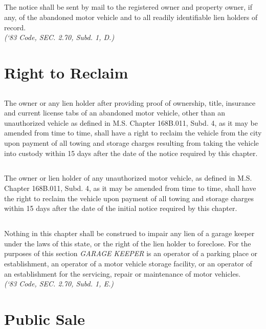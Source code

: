 \documentclass[code.tex]{subfiles}
\begin{document}
\subsection{}
The notice shall be sent by mail to the registered owner and property owner, if any, of the abandoned motor vehicle and to all readily identifiable lien holders of record.\\
\emph{(‘83 Code, SEC. 2.70, Subd. 1, D.)}

\section{Right to Reclaim}
\subsection{}
The owner or any lien holder after providing proof of ownership, title, insurance and current license tabs of an abandoned motor vehicle, other than an unauthorized vehicle as defined in M.S. Chapter 168B.011, Subd. 4, as it may be amended from time to time, shall have a right to reclaim the vehicle from the city upon payment of all towing and storage charges resulting from taking the vehicle into custody within 15 days after the date of the notice required by this chapter.
\subsection{}
The owner or lien holder of any unauthorized motor vehicle, as defined in M.S. Chapter 168B.011, Subd. 4, as it may be amended from time to time, shall have the right to reclaim the vehicle upon payment of all towing and storage charges within 15 days after the date of the initial notice required by this chapter.
\subsection{}
Nothing in this chapter shall be construed to impair any lien of a garage keeper under the laws of this state, or the right of the lien holder to foreclose.  For the purposes of this section \emph{GARAGE KEEPER} is an operator of a parking place or establishment, an operator of a motor vehicle storage facility, or an operator of an establishment for the servicing, repair or maintenance of motor vehicles.\\
\emph{(‘83 Code, SEC. 2.70, Subd. 1, E.)}

\section{Public Sale}
\end{document}
